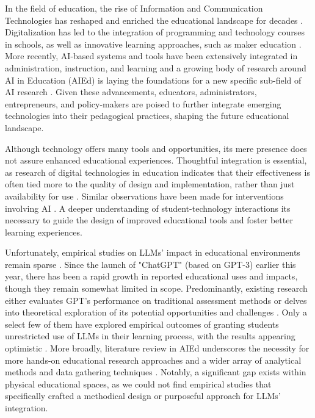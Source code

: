 \documentclass[sn-mathphys, Numbered]{sn-jnl}%
\theoremstyle{thmstyleone}%
\theoremstyle{thmstyletwo}%
\theoremstyle{thmstylethree}%
\begin{document}
In the field of education, the rise of Information and Communication Technologies has reshaped and enriched the educational landscape for decades \parencite{higgins_impact_2012}. Digitalization has led to the integration of programming and technology courses in schools, as well as innovative learning approaches, such as maker education \parencite{blikstein2013digital}. More recently, AI-based systems and tools have been extensively integrated in administration, instruction, and learning \parencite{chen_application_2020} and a growing body of research around AI in Education (AIEd) is laying the foundations for a new specific sub-field of AI research \parencite{niemi_ai_2023}.  Given these advancements, educators, administrators, entrepreneurs, and policy-makers are poised to further integrate emerging technologies into their pedagogical practices, shaping the future educational landscape.

Although technology offers many tools and opportunities, its mere presence does not assure enhanced educational experiences. Thoughtful integration is essential, as research of digital technologies in education indicates that their effectiveness is often tied more to the quality of design and implementation, rather than just availability for use \parencite{higgins_impact_2012}. Similar observations have been made for interventions involving AI \parencite{holmes_state_2022}. A deeper understanding of student-technology interactions its necessary to guide the design of improved educational tools and foster better learning experiences. 

Unfortunately, empirical studies on LLMs' impact in educational environments remain sparse \parencite{montenegro-rueda_impact_2023, lo_what_2023}. Since the launch of "ChatGPT" (based on GPT-3) earlier this year, there has been a rapid growth in reported educational uses and impacts, though they remain somewhat limited in scope. Predominantly, existing research either evaluates GPT's performance on traditional assessment methods \parencite{nisar_is_2023}  or delves into theoretical exploration of its potential opportunities and challenges \parencite{cain_gpteammate_2023} . Only a select few of them have explored empirical outcomes of granting students unrestricted use of LLMs in their learning process, with the results appearing optimistic \parencite{fauzi_analysing_2023, yilmaz_effect_2023}. More broadly, literature review in AIEd  underscores the necessity for more hands-on educational research approaches and a wider array of analytical methods and data gathering techniques \parencite{zawacki-richter_systematic_2019, holmes_state_2022}. Notably, a significant gap exists within physical educational spaces, as we could not find empirical studies that specifically crafted a methodical design or purposeful approach for LLMs' integration.
\end{document}
